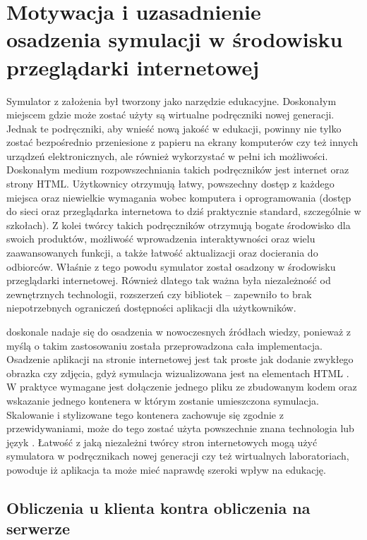 \section{Motywacja i uzasadnienie osadzenia symulacji w środowisku przeglądarki internetowej}

Symulator \en z założenia był tworzony jako narzędzie edukacyjne. Doskonałym
miejscem gdzie może zostać użyty są wirtualne podręczniki nowej generacji.
Jednak te podręczniki, aby wnieść nową jakość w edukacji, powinny nie tylko
zostać bezpośrednio przeniesione z papieru na ekrany komputerów czy też innych
urządzeń elektronicznych, ale również wykorzystać w pełni ich możliwości.
Doskonałym medium rozpowszechniania takich podręczników jest internet oraz
strony HTML. Użytkownicy otrzymują łatwy, powszechny dostęp z każdego miejsca
oraz niewielkie wymagania wobec komputera i oprogramowania (dostęp do sieci oraz
przeglądarka internetowa to dziś praktycznie standard, szczególnie w szkołach).
Z kolei twórcy takich podręczników otrzymują bogate środowisko dla swoich
produktów, możliwość wprowadzenia interaktywności oraz wielu zaawansowanych
funkcji, a także łatwość aktualizacji oraz docierania do odbiorców.  Właśnie z
tego powodu symulator \en został osadzony w środowisku przeglądarki
internetowej. Również dlatego tak ważna była niezależność od zewnętrznych
technologii, rozszerzeń czy bibliotek -- zapewniło to brak niepotrzebnych
ograniczeń dostępności aplikacji dla użytkowników.

\en doskonale nadaje się do osadzenia w nowoczesnych źródłach wiedzy, ponieważ z
myślą o takim zastosowaniu została przeprowadzona cała implementacja. Osadzenie
aplikacji na stronie internetowej jest tak proste jak dodanie zwykłego obrazka
czy zdjęcia, gdyż symulacja wizualizowana jest na elementach HTML . W
praktyce wymagane jest dołączenie jednego pliku ze zbudowanym kodem \en oraz
wskazanie jednego kontenera  w którym zostanie umieszczona symulacja.
Skalowanie i stylizowane tego kontenera zachowuje się zgodnie z przewidywaniami,
może do tego zostać użyta powszechnie znana technologia  lub język \js.
Łatwość z jaką niezależni twórcy stron internetowych mogą użyć symulatora \en w
podręcznikach nowej generacji czy też wirtualnych laboratoriach, powoduje iż
aplikacja ta może mieć naprawdę szeroki wpływ na edukację.

\subsection{Obliczenia u klienta kontra obliczenia na serwerze}

